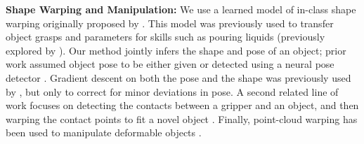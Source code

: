\documentclass{article}
\begin{document}
\textbf{Shape Warping and Manipulation:} We use a learned model of in-class shape warping originally proposed by \citet{rodriguez18learning}. This model was previously used to transfer object grasps \cite{rodriguez18transferring,rodriguez18transferringa,klamt18supervised} and parameters for skills such as pouring liquids \cite{thompson21shapebased} (previously explored by \cite{brandi14generalizing}). Our method jointly infers the shape and pose of an object; prior work assumed object pose to be either given \cite{thompson21shapebased} or detected using a neural pose detector \cite{klamt18supervised}. Gradient descent on both the pose and the shape was previously used by \citet{rodriguez18transferring,rodriguez18transferringa}, but only to correct for minor deviations in pose. A second related line of work focuses on detecting the contacts between a gripper and an object, and then warping the contact points to fit a novel object \cite{li07datadriven,benamor12generalization,hillenbrand12transferring,jakel12learning,stouraitis15functional,rodriguez18learning,pavlichenko19autonomous,tian19transferring}. Finally, point-cloud warping has been used to manipulate deformable objects \cite{lee15learning,schulman16learning}.


\end{document}
